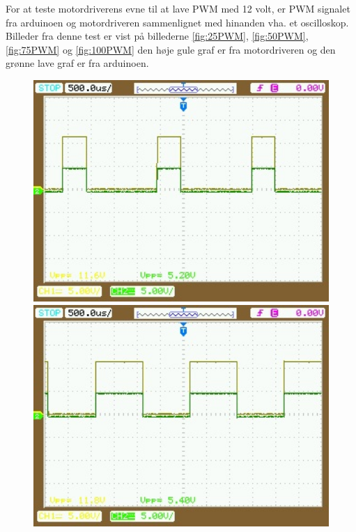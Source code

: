 For at teste motordriverens evne til at lave PWM med 12 volt, er PWM signalet fra arduinoen og motordriveren sammenlignet med hinanden vha. et oscilloskop. Billeder fra denne test er vist på  billederne \ref{fig:25PWM}, \ref{fig:50PWM}, \ref{fig:75PWM} og \ref{fig:100PWM} den høje gule graf er fra motordriveren og den grønne lave graf er fra arduinoen.

\newpage

 \begin{figure}[htbp] \centering
\begin{minipage}[b]{0.48\textwidth} \centering
\includegraphics[width=1.00\textwidth]{billeder/Hardware/motor25PWM.jpg} %
\end{minipage} \hfill
\begin{minipage}[b]{0.48\textwidth} \centering
\includegraphics[width=1.00\textwidth]{billeder/Hardware/motor50PWM.jpg} %

\end{minipage}
\end{figure}
